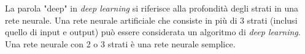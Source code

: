 \par La parola "deep" in \textit{deep learning} si riferisce alla profondità degli strati in una rete neurale. Una rete neurale artificiale che consiste in più di 3 strati (inclusi quello di input e output) può essere considerata un algoritmo di \textit{deep learning}\supercite{neuralNetworksIBM}. Una rete neurale con 2 o 3 strati è una rete neurale semplice.

\clearpage